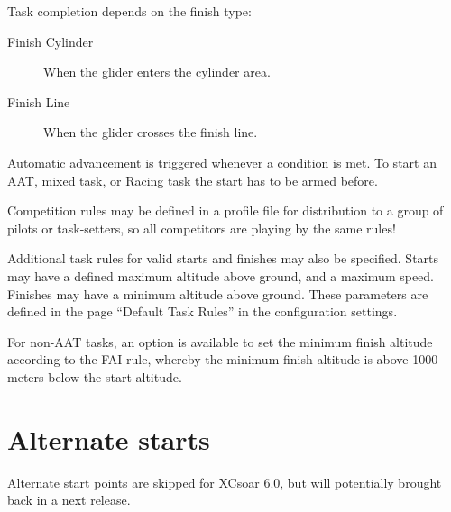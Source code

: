 \documentclass[a4paper,12pt]{refrep}
\begin{document}
Task completion depends on the finish type:
\begin{description}
\item[Finish Cylinder] When the glider enters the cylinder area.
\item[Finish Line] When the glider crosses the finish line.
\end{description}

Automatic advancement is triggered whenever a condition is met. To start an AAT,
mixed task, or Racing task the start has to be armed before. 


\tip Competition rules may be defined in a profile file for
distribution to a group of pilots or task-setters, so all competitors
are playing by the same rules!

Additional task rules for valid starts and finishes may also be
specified.  Starts may have a defined maximum altitude above ground,
and a maximum speed.  Finishes may have a minimum altitude above
ground.  These parameters are defined in the page ``Default Task Rules'' in
the configuration  settings.

For non-AAT tasks, an option is available to set the minimum finish
altitude according to the FAI rule, whereby the minimum finish
altitude is above 1000 meters below the start altitude.

\section{Alternate starts}\label{sec:alternate-starts}

Alternate start points are skipped for XCsoar 6.0, but
will potentially brought back in a next release. 


  

  
\end{document}
